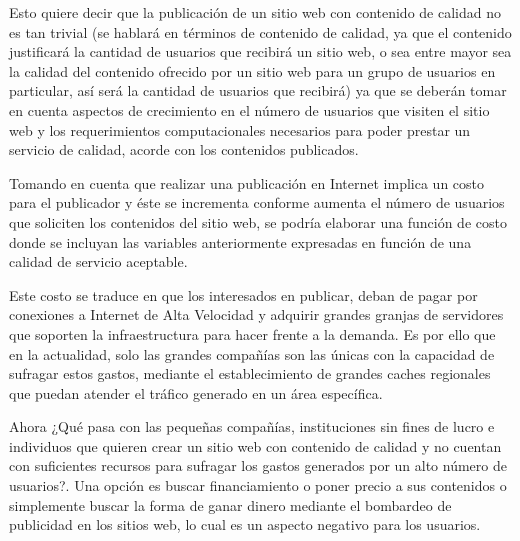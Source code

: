 Esto quiere decir que la publicación de un sitio web con contenido de calidad no es tan trivial (se hablará en términos de contenido de calidad, ya que el contenido justificará la cantidad de usuarios que recibirá un sitio web, o sea entre mayor sea la calidad del contenido ofrecido por un sitio web para un grupo de usuarios en particular, así será la cantidad de usuarios que recibirá) ya que se deberán tomar en cuenta aspectos de crecimiento en el número de usuarios que visiten el sitio web y los requerimientos computacionales necesarios para poder prestar un servicio de calidad, acorde con los contenidos publicados.

Tomando en cuenta que realizar una publicación en Internet implica un costo para el publicador y éste se incrementa conforme aumenta el número de usuarios que soliciten los contenidos del sitio web, se podría elaborar una función de costo donde se incluyan las variables anteriormente expresadas en función de una calidad de servicio aceptable.

Este costo se traduce en que los interesados en publicar, deban de pagar por conexiones a Internet de Alta Velocidad y adquirir grandes granjas de servidores que soporten la infraestructura para hacer frente a la demanda. Es por ello que en la actualidad, solo las grandes compañías son las únicas con la capacidad de sufragar estos gastos, mediante el establecimiento de grandes caches regionales que puedan atender el tráfico generado en un área específica.

Ahora ¿Qué pasa con las pequeñas compañías, instituciones sin fines de lucro e individuos que quieren crear un sitio web con contenido de calidad y no cuentan con suficientes recursos para sufragar los gastos generados por un alto número de usuarios?. Una opción es buscar financiamiento o poner precio a sus contenidos o simplemente buscar la forma de ganar dinero mediante el bombardeo de publicidad en los sitios web, lo cual es un aspecto negativo para los usuarios.

